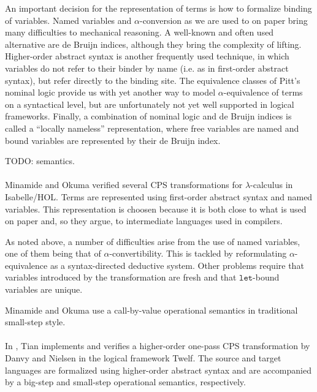 \documentclass[a4paper,11pt,draft]{article}
\newcommand{\kw}[1]{\mathtt{#1}}
\begin{document}
An important decision for the representation of terms is how to formalize
binding of variables.
Named variables and $\alpha$-conversion as we are used to on paper bring many
difficulties to mechanical reasoning.
A well-known and often used alternative are de Bruijn indices, although they
bring the complexity of lifting.
Higher-order abstract syntax is another frequently used technique, in which
variables do not refer to their binder by name (i.e. as in first-order
abstract syntax), but refer directly to the binding site.
The equivalence classes of Pitt's nominal logic provide us with yet another
way to model $\alpha$-equivalence of terms on a syntactical level, but are
unfortunately not yet well supported in logical frameworks.
Finally, a combination of nominal logic and de Bruijn indices is called a
``locally nameless'' representation, where free variables are named and bound
variables are represented by their de Bruijn index.

TODO: semantics.

\paragraph{}

Minamide and Okuma \cite{Minamide-Okuma-03} verified several CPS
transformations for $\lambda$-calculus in Isabelle/HOL.
Terms are represented using first-order abstract syntax and named variables.
This representation is choosen because it is both close to what is used on
paper and, so they argue, to intermediate languages used in compilers.

As noted above, a number of difficulties arise from the use of named
variables, one of them being that of $\alpha$-convertibility.
This is tackled by reformulating $\alpha$-equivalence as a syntax-directed
deductive system. Other problems require that variables introduced by the
transformation are fresh and that $\kw{let}$-bound variables are unique.

Minamide and Okuma use a call-by-value operational semantics in traditional
small-step style.

\paragraph{}

In \cite{Tian-06}, Tian implements and verifies a higher-order one-pass CPS
transformation by Danvy and Nielsen in the logical framework Twelf.
The source and target languages are formalized using higher-order abstract
syntax and are accompanied by a big-step and small-step operational semantics,
respectively.
\end{document}
